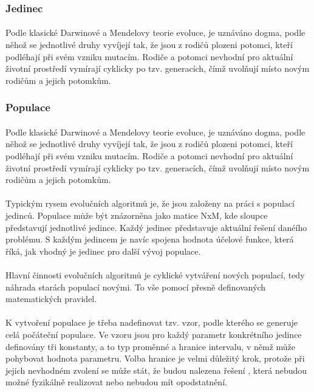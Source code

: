 \documentclass[bc,male,java,dept460]{diploma}		%
\begin{document}
\subsubsection{Jedinec}
\paragraph*{}
Podle klasické Darwinové a Mendelovy teorie evoluce, je uznáváno dogma, podle něhož se jednotlivé druhy vyvíjejí tak, že jsou z rodičů plozeni potomci, kteří podléhají při svém vzniku mutacím. Rodiče a potomci nevhodní pro aktuální životní prostředí vymírají cyklicky po tzv. generacích, čímž uvolňují místo novým rodičům a jejich potomkům.

\subsubsection{Populace}
\paragraph*{}
Podle klasické Darwinové a Mendelovy teorie evoluce, je uznáváno dogma, podle něhož se jednotlivé druhy vyvíjejí tak, že jsou z rodičů plozeni potomci, kteří podléhají při svém vzniku mutacím. Rodiče a potomci nevhodní pro aktuální životní prostředí vymírají cyklicky po tzv. generacích, čímž uvolňují místo novým rodičům a jejich potomkům.

\paragraph*{}
Typickým rysem evolučních algoritmů je, že jsou založeny na práci s populací jedinců. Populace může být znázorněna jako matice NxM, kde sloupce představují jednotlivé jedince. Každý jedinec představuje aktuální řešení danéího problému. S každým jedincem je navíc spojena hodnota účelové funkce, která říká, jak vhodný je jedinec pro další vývoj populace.

\paragraph*{}
Hlavní činnosti evolučních algoritmů je cyklické vytváření nových populací, tedy náhrada starách populací novými. To vše pomocí přesně definovaných matematických pravidel.

\paragraph*{}
K vytvoření populace je třeba nadefinovat tzv. vzor, podle kterého se generuje celá počáteční populace. Ve vzoru jsou pro každý parametr konkrétního jedince definovány tři konstanty, a to typ proměnné a hranice intervalu, v němž může pohybovat hodnota parametru. Volba hranice je velmi důležitý krok, protože při jejich nevhodném zvolení se může stát, že budou nalezena řešení , která nebudou možné fyzikálně realizovat nebo nebudou mít opodstatnění. 
\end{document}
